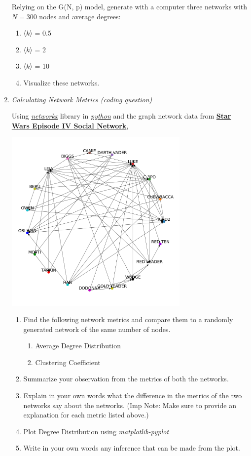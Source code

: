 \documentclass[12pt,letterpaper]{article}
\begin{document}
\begin{enumerate}
Relying on the G(N, p) model, generate with a computer three networks with $N = 300$ nodes and average degrees:
\begin{enumerate}
    \item 〈$k$〉 = 0.5
    \item 〈$k$〉 = 2  
    \item 〈$k$〉 = 10 
    \item Visualize these networks.
\end{enumerate}




\item \textit{Calculating Network Metrics (coding question)}

Using \href{https://networkx.org/documentation/stable/reference/index.html}{\textit{networkx}} library in \href{https://docs.python.org/3/}{\textit{python}} and the graph network data from \href{https://zenodo.org/record/1411479#.YzsonuzMJ6Q}{\textbf{Star Wars Episode IV Social Network}}, 

\includegraphics[height=9cm]{starwars_network.png}
\begin{enumerate}
    \item Find the following network metrics and compare them to a randomly generated network of the same number of nodes.
    \begin{enumerate}
        \item Average Degree Distribution
        \item Clustering Coefficient
    \end{enumerate}
    \item Summarize your observation from the metrics of both the networks.
    \item Explain in your own words what the difference in the metrics of the two networks say about the networks. (Imp Note: Make sure to provide an explanation for each metric listed above.)
    \item Plot Degree Distribution using \href{https://matplotlib.org/3.5.1/api/_as_gen/matplotlib.pyplot.html}{\textit{matplotlib-pyplot}}
    \item Write in your own words any inference that can be made from the plot.
\end{enumerate}



\end{enumerate}
\end{document}
